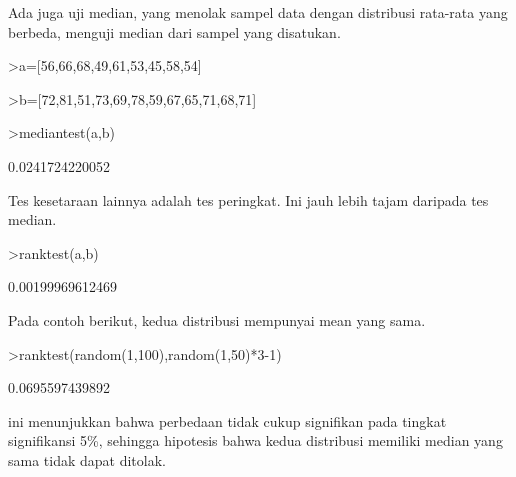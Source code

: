 \documentclass[a4paper,10pt]{article}
\begin{document}
\begin{eulernotebook}
\begin{eulercomment}
\begin{eulercomment}
\begin{eulercomment}
\begin{eulercomment}
\begin{eulercomment}
Ada juga uji median, yang menolak sampel data dengan distribusi
rata-rata yang berbeda, menguji median dari sampel yang disatukan.
\end{eulercomment}
\begin{eulerprompt}
>a=[56,66,68,49,61,53,45,58,54]
\end{eulerprompt}
\begin{euleroutput}
  [56,  66,  68,  49,  61,  53,  45,  58,  54]
\end{euleroutput}
\begin{eulerprompt}
>b=[72,81,51,73,69,78,59,67,65,71,68,71]
\end{eulerprompt}
\begin{euleroutput}
  [72,  81,  51,  73,  69,  78,  59,  67,  65,  71,  68,  71]
\end{euleroutput}
\begin{eulerprompt}
>mediantest(a,b)
\end{eulerprompt}
\begin{euleroutput}
  0.0241724220052
\end{euleroutput}
\begin{eulercomment}
Tes kesetaraan lainnya adalah tes peringkat. Ini jauh lebih tajam
daripada tes median.
\end{eulercomment}
\begin{eulerprompt}
>ranktest(a,b)
\end{eulerprompt}
\begin{euleroutput}
  0.00199969612469
\end{euleroutput}
\begin{eulercomment}
Pada contoh berikut, kedua distribusi mempunyai mean yang sama.
\end{eulercomment}
\begin{eulerprompt}
>ranktest(random(1,100),random(1,50)*3-1)
\end{eulerprompt}
\begin{euleroutput}
  0.0695597439892
\end{euleroutput}
\begin{eulercomment}
ini menunjukkan bahwa perbedaan tidak cukup signifikan pada tingkat
signifikansi 5\%, sehingga hipotesis bahwa kedua distribusi memiliki
median yang sama tidak dapat ditolak.


\end{eulercomment}
\end{eulercomment}
\end{eulercomment}
\end{eulercomment}
\end{eulercomment}
\end{eulernotebook}
\end{document}
